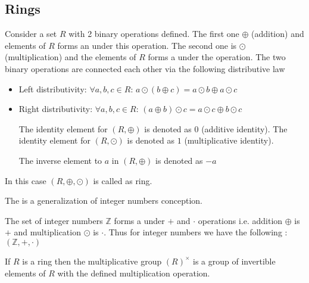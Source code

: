 \begin{appendices}
\subsection{Rings}

\begin{definition}[Ring]
  Consider a set $R$ with 2 binary operations defined. The first one
  $\oplus$ (addition) and elements of $R$ forms an
  under this operation. The second one is $\odot$ (multiplication) and
  the elements of $R$ forms a  under 
  the operation. The two binary operations are connected each other
  via the following distributive law
  \begin{itemize}
  \item Left distributivity:
    $\forall a,b,c \in R$:
    $a \odot \left(b \oplus c\right) =
    a \odot b \oplus a \odot c$
  \item Right distributivity:
    $\forall a,b,c \in R$:
    $\left( a \oplus b \right) \odot c =
    a \odot c \oplus b \odot c$
    
  The identity element for $\left(R, \oplus\right)$ is denoted as $0$
  (additive identity).
  The identity element for $\left(R, \odot\right)$ is denoted as $1$
  (multiplicative identity).

  The inverse element to $a$ in $\left(R, \oplus\right)$ is denoted as $-a$
  \end{itemize}

  In this case $\left(R, \oplus, \odot\right)$ is called as ring.
  \label{def:ring}
\end{definition}

The  is a generalization of integer numbers conception.
\begin{example}
  The set of integer numbers $\mathbb{Z}$ forms a 
  under $+$ and $\cdot$ operations i.e. addition $\oplus$ is
  $+$ and multiplication $\odot$ is $\cdot$. Thus for integer
  numbers we have the following :
  $\left(\mathbb{Z}, +, \cdot\right)$
  \label{ex:ring}
\end{example}

\begin{definition}
  If $R$ is a ring then the multiplicative group
  $\left(R\right)^\times$
  is a group of
  invertible elements of $R$ with the defined multiplication operation.
  \label{def:multiplicativegroup}
\end{definition}


\end{appendices}

